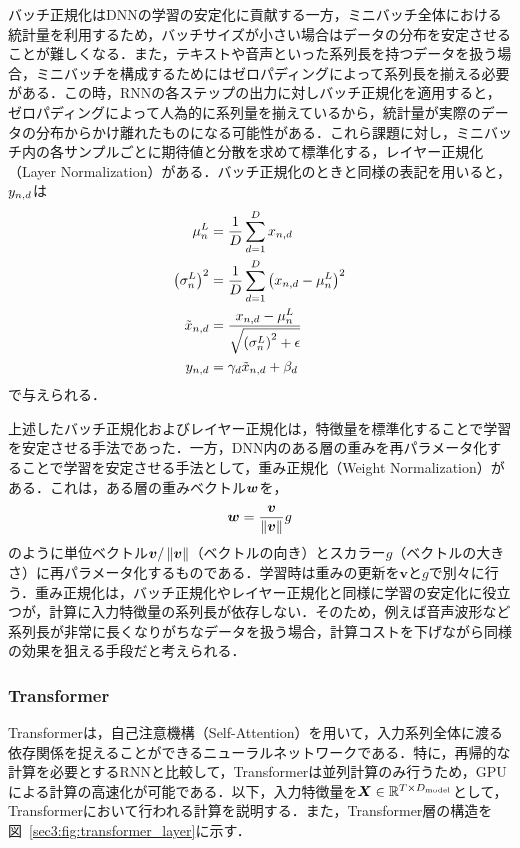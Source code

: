 バッチ正規化はDNNの学習の安定化に貢献する一方，ミニバッチ全体における統計量を利用するため，バッチサイズが小さい場合はデータの分布を安定させることが難しくなる．また，テキストや音声といった系列長を持つデータを扱う場合，ミニバッチを構成するためにはゼロパディングによって系列長を揃える必要がある．この時，RNNの各ステップの出力に対しバッチ正規化を適用すると，ゼロパディングによって人為的に系列量を揃えているから，統計量が実際のデータの分布からかけ離れたものになる可能性がある．これら課題に対し，ミニバッチ内の各サンプルごとに期待値と分散を求めて標準化する，レイヤー正規化（Layer Normalization）\cite{ba2016layer}がある．バッチ正規化のときと同様の表記を用いると，$y_{n, d}$は
\begin{align}
    \mu^{L}_{n}                      & = \frac{1}{D} \sum_{d = 1}^{D} x_{n, d}                                  \\
    \left(\sigma^{L}_{n}\right)^{2}              & = \frac{1}{D} \sum_{d = 1}^{D} \left(x_{n, d} - \mu^{L}_{n}\right)^{2} \\
    \tilde{x}_{n, d} & = \frac{x_{n, d} - \mu^{L}_{n}}{\sqrt{\left(\sigma^{L}_{n}\right)^{2} + \epsilon}}       \\
    y_{n, d}        & = \gamma_{d} \tilde{x}_{n, d} +  \beta_{d}
\end{align}
で与えられる．

上述したバッチ正規化およびレイヤー正規化は，特徴量を標準化することで学習を安定させる手法であった．一方，DNN内のある層の重みを再パラメータ化することで学習を安定させる手法として，重み正規化（Weight Normalization）\cite{salimans2016weight}がある．これは，ある層の重みベクトル$\bm{w}$を，
\begin{equation}
    \bm{w} = \frac{\bm{v}}{\left\|\bm{v}\right\|} g
\end{equation}
のように単位ベクトル$\bm{v} / \left\|\bm{v}\right\|$（ベクトルの向き）とスカラー$g$（ベクトルの大きさ）に再パラメータ化するものである．学習時は重みの更新を$\bm{v}$と$g$で別々に行う．重み正規化は，バッチ正規化やレイヤー正規化と同様に学習の安定化に役立つが，計算に入力特徴量の系列長が依存しない．そのため，例えば音声波形など系列長が非常に長くなりがちなデータを扱う場合，計算コストを下げながら同様の効果を狙える手段だと考えられる．

\subsubsection{Transformer}
Transformer\cite{vaswani2017attention}は，自己注意機構（Self-Attention）を用いて，入力系列全体に渡る依存関係を捉えることができるニューラルネットワークである．特に，再帰的な計算を必要とするRNNと比較して，Transformerは並列計算のみ行うため，GPUによる計算の高速化が可能である．以下，入力特徴量を$\bm{X} \in \mathbb{R}^{T \times D_{\text{model}}}$として，Transformerにおいて行われる計算を説明する．また，Transformer層の構造を図~\ref{sec3:fig:transformer_layer}に示す．

